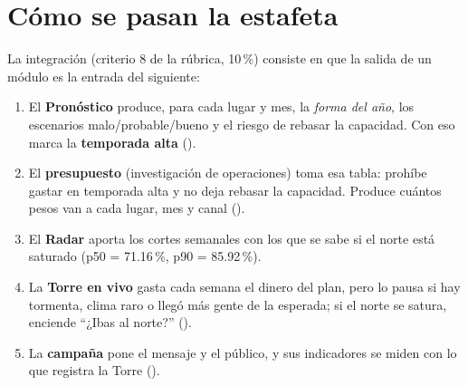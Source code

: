 \section{Cómo se pasan la estafeta}
\label{sec:estafeta}
La integración (criterio 8 de la rúbrica, 10\,\%) consiste en que la salida de un módulo es la entrada del siguiente:

\begin{enumerate}
\item El \textbf{Pronóstico} produce, para cada lugar y mes, la \emph{forma del año}, los escenarios malo/probable/bueno y
  el riesgo de rebasar la capacidad. Con eso marca la \textbf{temporada alta} ().
\item El \textbf{presupuesto} (investigación de operaciones) toma esa tabla: prohíbe gastar en temporada alta y no deja
  rebasar la capacidad. Produce cuántos pesos van a cada lugar, mes y canal ().
\item El \textbf{Radar} aporta los cortes semanales con los que se sabe si el norte está saturado (p50 = 71.16\,\%,
  p90 = 85.92\,\%).
\item La \textbf{Torre en vivo} gasta cada semana el dinero del plan, pero lo pausa si hay tormenta, clima raro o llegó
  más gente de la esperada; si el norte se satura, enciende ``¿Ibas al norte?'' ().
\item La \textbf{campaña} pone el mensaje y el público, y sus indicadores se miden con lo que registra la Torre
  ().
\end{enumerate}

